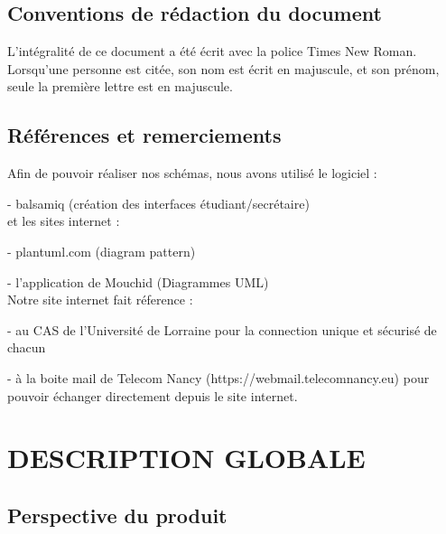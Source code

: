 \documentclass{scrreprt}
\begin{document}
\section{Conventions de rédaction du document}

\hspace{1cm}L'intégralité de ce document a été écrit avec la police Times New Roman.\\

\hspace{0.6cm}Lorsqu'une personne est citée, son nom est écrit en majuscule, et son prénom, seule la première lettre est en majuscule.

\section{Références et remerciements}
\hspace{1cm}Afin de pouvoir réaliser nos schémas, nous avons utilisé le logiciel : 

\hspace{1cm}- balsamiq (création des interfaces étudiant/secrétaire) \\

\hspace{0.6cm}et les sites internet :

\hspace{1cm}- plantuml.com (diagram pattern)

\hspace{1cm}- l'application de Mouchid (Diagrammes UML)\\

\hspace{0.6cm}Notre site internet fait réference :

\hspace{1cm}- au CAS de l'Université de Lorraine pour la connection unique et sécurisé de chacun

\hspace{1cm}- à la boite mail de Telecom Nancy (https://webmail.telecomnancy.eu) pour pouvoir échanger directement depuis le site internet.\\
	

\chapter{DESCRIPTION GLOBALE }

\section{Perspective du produit}
\end{document}
